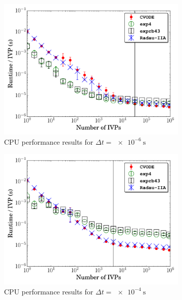 \documentclass[preprint,review,11pt]{elsarticle}
\begin{document}
\begin{figure}[htbp]
  \centering
  \begin{subfigure}{0.49\textwidth}
      \includegraphics[width=\linewidth]{H2_1e-06_cpu.pdf}
      \caption{CPU performance results for $\Delta t = \SI{e-6}{\second}$}
      \label{F:h2_cpu_perf_small}
  \end{subfigure}
  \begin{subfigure}{0.49\textwidth}
      \includegraphics[width=\linewidth]{H2_1e-04_cpu.pdf}
      \caption{CPU performance results for $\Delta t = \SI{e-4}{\second}$}
      \label{F:h2_cpu_perf_large}
  \end{subfigure}\\
  \begin{subfigure}{0.49\textwidth}

\end{subfigure}
\end{figure}
\end{document}
